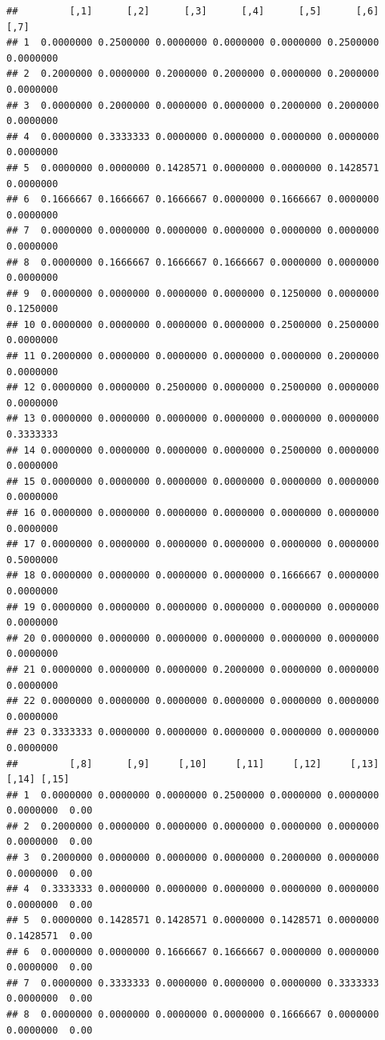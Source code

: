 \documentclass[]{book}
\begin{document}
\begin{verbatim}
##         [,1]      [,2]      [,3]      [,4]      [,5]      [,6]      [,7]
## 1  0.0000000 0.2500000 0.0000000 0.0000000 0.0000000 0.2500000 0.0000000
## 2  0.2000000 0.0000000 0.2000000 0.2000000 0.0000000 0.2000000 0.0000000
## 3  0.0000000 0.2000000 0.0000000 0.0000000 0.2000000 0.2000000 0.0000000
## 4  0.0000000 0.3333333 0.0000000 0.0000000 0.0000000 0.0000000 0.0000000
## 5  0.0000000 0.0000000 0.1428571 0.0000000 0.0000000 0.1428571 0.0000000
## 6  0.1666667 0.1666667 0.1666667 0.0000000 0.1666667 0.0000000 0.0000000
## 7  0.0000000 0.0000000 0.0000000 0.0000000 0.0000000 0.0000000 0.0000000
## 8  0.0000000 0.1666667 0.1666667 0.1666667 0.0000000 0.0000000 0.0000000
## 9  0.0000000 0.0000000 0.0000000 0.0000000 0.1250000 0.0000000 0.1250000
## 10 0.0000000 0.0000000 0.0000000 0.0000000 0.2500000 0.2500000 0.0000000
## 11 0.2000000 0.0000000 0.0000000 0.0000000 0.0000000 0.2000000 0.0000000
## 12 0.0000000 0.0000000 0.2500000 0.0000000 0.2500000 0.0000000 0.0000000
## 13 0.0000000 0.0000000 0.0000000 0.0000000 0.0000000 0.0000000 0.3333333
## 14 0.0000000 0.0000000 0.0000000 0.0000000 0.2500000 0.0000000 0.0000000
## 15 0.0000000 0.0000000 0.0000000 0.0000000 0.0000000 0.0000000 0.0000000
## 16 0.0000000 0.0000000 0.0000000 0.0000000 0.0000000 0.0000000 0.0000000
## 17 0.0000000 0.0000000 0.0000000 0.0000000 0.0000000 0.0000000 0.5000000
## 18 0.0000000 0.0000000 0.0000000 0.0000000 0.1666667 0.0000000 0.0000000
## 19 0.0000000 0.0000000 0.0000000 0.0000000 0.0000000 0.0000000 0.0000000
## 20 0.0000000 0.0000000 0.0000000 0.0000000 0.0000000 0.0000000 0.0000000
## 21 0.0000000 0.0000000 0.0000000 0.2000000 0.0000000 0.0000000 0.0000000
## 22 0.0000000 0.0000000 0.0000000 0.0000000 0.0000000 0.0000000 0.0000000
## 23 0.3333333 0.0000000 0.0000000 0.0000000 0.0000000 0.0000000 0.0000000
##         [,8]      [,9]     [,10]     [,11]     [,12]     [,13]     [,14] [,15]
## 1  0.0000000 0.0000000 0.0000000 0.2500000 0.0000000 0.0000000 0.0000000  0.00
## 2  0.2000000 0.0000000 0.0000000 0.0000000 0.0000000 0.0000000 0.0000000  0.00
## 3  0.2000000 0.0000000 0.0000000 0.0000000 0.2000000 0.0000000 0.0000000  0.00
## 4  0.3333333 0.0000000 0.0000000 0.0000000 0.0000000 0.0000000 0.0000000  0.00
## 5  0.0000000 0.1428571 0.1428571 0.0000000 0.1428571 0.0000000 0.1428571  0.00
## 6  0.0000000 0.0000000 0.1666667 0.1666667 0.0000000 0.0000000 0.0000000  0.00
## 7  0.0000000 0.3333333 0.0000000 0.0000000 0.0000000 0.3333333 0.0000000  0.00
## 8  0.0000000 0.0000000 0.0000000 0.0000000 0.1666667 0.0000000 0.0000000  0.00

\end{verbatim}
\end{document}
